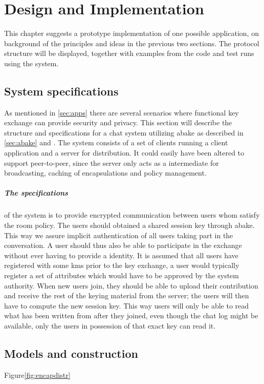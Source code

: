 \chapter{Design and Implementation}\label{chp:designimpl}
This chapter suggests a prototype implementation of one possible application, on background of the principles and ideas in the previous two sections. The protocol structure will be displayed, together with examples from the code and test runs using the system.

\section{System specifications}\label{sec:chat}
As mentioned in \ref{sec:apps} there are several scenarios where functional key exchange can provide security and privacy. This section will describe the structure and specifications for a chat system utilizing \gls{abake} as described in \ref{sec:abake} and \cite{DBLP:abake}. The system consists of a set of clients running a client application and a server for distribution. It could easily have been altered to support peer-to-peer, since the server only acts as a intermediate for broadcasting, caching of encapsulations and policy management. 
\paragraph{The specifications} of the system is to provide encrypted communication between users whom satisfy the room policy. The users should obtained a shared session key through \gls{abake}. This way we assure implicit authentication of all users taking part in the conversation. A user should thus also be able to participate in the exchange without ever having to provide a identity. It is assumed that all users have registered with some \gls{kms} prior to the key exchange, a user would typically register a set of attributes which would have to be approved by the system authority. When new users join, they should be able to upload their contribution and receive the rest of the keying material from the server; the users will then have to compute the new session key. This way users will only be able to read what has been written from after they joined, even though the chat log might be available, only the users in possession of that exact key can read it.
\section{Models and construction}
Figure\ref{fig:encapdistr}

